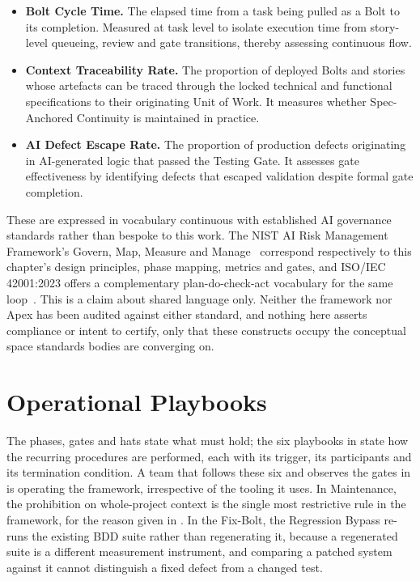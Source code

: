 \begin{itemize}[leftmargin=0.6cm, itemsep=0.4em]

\item \textbf{Bolt Cycle Time.} The elapsed time from a task being pulled as a Bolt to its completion. Measured at task level to isolate execution time from story-level queueing, review and gate transitions, thereby assessing continuous flow.

\item \textbf{Context Traceability Rate.} The proportion of deployed Bolts and stories whose artefacts can be traced through the locked technical and functional specifications to their originating Unit of Work. It measures whether Spec-Anchored Continuity is maintained in practice.

\item \textbf{AI Defect Escape Rate.} The proportion of production defects originating in AI-generated logic that passed the Testing Gate. It assesses gate effectiveness by identifying defects that escaped validation despite formal gate completion.

\end{itemize}

These are expressed in vocabulary continuous with established \ac{AI} governance standards rather than bespoke to this work. The \ac{NIST} \ac{AI} Risk Management Framework's Govern, Map, Measure and Manage~\cite{NIST:2023rmf} correspond respectively to this chapter's design principles, phase mapping, metrics and gates, and ISO/IEC 42001:2023 offers a complementary plan-do-check-act vocabulary for the same loop~\cite{ISO/IEC:2023ai}. This is a claim about shared language only. Neither the framework nor Apex has been audited against either standard, and nothing here asserts compliance or intent to certify, only that these constructs occupy the conceptual space standards bodies are converging on.

\section{Operational Playbooks}
\label{sec:playbooks}


The phases, gates and hats state what must hold; the six playbooks in  state how the recurring procedures are performed, each with its trigger, its participants and its termination condition. A team that follows these six and observes the gates in  is operating the framework, irrespective of the tooling it uses. In Maintenance, the prohibition on whole-project context is the single most restrictive rule in the framework, for the reason given in . In the Fix-Bolt, the Regression Bypass re-runs the existing \ac{BDD} suite rather than regenerating it, because a regenerated suite is a different measurement instrument, and comparing a patched system against it cannot distinguish a fixed defect from a changed test.

